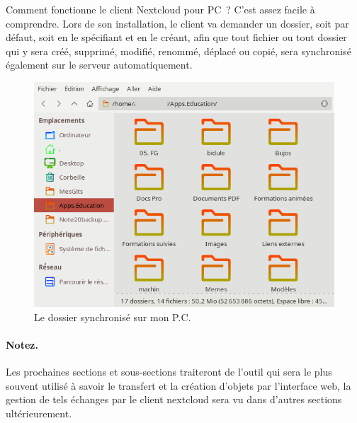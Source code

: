 Comment fonctionne le client Nextcloud pour PC~? 
C'est assez facile à comprendre. 
Lors de son installation, le client va demander un dossier, soit par défaut, soit en le spécifiant et en le créant, afin que tout fichier ou tout dossier qui y sera créé, supprimé, modifié, renommé, déplacé ou copié, sera synchronisé également sur le serveur automatiquement.
\begin{figure} \label{fig-dossier-synchro}
	\centering
	\includegraphics{./Captures/nextcloud-client.dossier.synchronise.png}
	\caption{Le dossier synchronisé sur mon P.C.}
\end{figure}

\paragraph{Notez.} 
Les prochaines sections et sous-sections traiteront de l'outil qui sera le plus souvent utilisé à savoir le transfert et la création d'objets par l'interface web, la gestion de tels échanges par le client nextcloud sera vu dans d'autres sections ultérieurement.